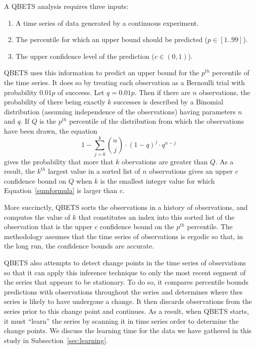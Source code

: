 A QBETS analysis requires three inputs:
\begin{enumerate}
\item A time series of data generated by a continuous experiment.
\item The percentile for which an upper bound should be predicted ($p \in [1..99]$).
\item The upper confidence level of the prediction ($c \in (0,1)$).
\end{enumerate}

QBETS uses this information to predict an upper bound for 
the $p^{th}$ percentile of the time series.  It does so by treating each
observation as a Bernoulli trial with probability $0.01p$ of succeess.  Let $q
= 0.01p$.  Then if there are $n$ observations, the probability of there being
exactly $k$ successes is described by a Binomial distribution (assuming
independence of the observations)
having parameters $n$ and $q$.  If $Q$ is the $p^{th}$ percentile of the
distribution from which the observations have been drawn, the equation 
\vspace{-0.1in}
\begin{equation}\label{sumformula}
1 - \sum_{j=0}^k { n \choose j } \cdot (1-q)^{j} \cdot q^{n-j}
\end{equation}
gives the probability that more that $k$ obervations are greater than $Q$.
As a result, the $k^{th}$ largest value in a sorted list of $n$ observations
gives an upper $c$ confidence bound on $Q$ when $k$ is the smallest integer
value for which Equation~\ref{sumformula} is larger than $c$.

More succinctly, QBETS sorts the observations in a history of observations,
and computes the value of $k$ that constitutes an index into 
this sorted list of the observation that is the upper $c$ confidence bound on
the $p^{th}$ percentile. The methodology assumes that the time series of 
observations is 
ergodic so that, in the long run, the confidence bounds are accurate.  

QBETS also attempts to detect change points in the time series of observations 
so that it can apply this inference technique to only the most recent 
segment of the series that appears to be stationary.  
To do so, it compares
percentile bounds predictions with observations throughout the series and
determines where thes series is likely to have undergone a change.  It then
discards observations from the series prior to this change point and
continues.  As a result, when QBETS starts, it must ``learn'' the series by
scanning it in time series order to determine the change points.  We discuss
the learning time for the data we have gathered in this study in
Subsection~\ref{sec:learning}.

